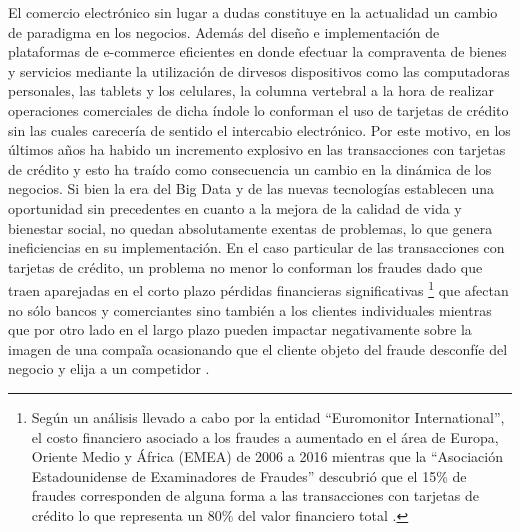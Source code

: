 \documentclass[11pt,a4paper]{article}
\begin{document}
El comercio electr\'onico sin lugar a dudas constituye en la actualidad un cambio de paradigma en los negocios. Adem\'as del dise\~no e implementaci\'on de plataformas de e-commerce eficientes en donde efectuar la compraventa de bienes y servicios mediante la utilizaci\'on de dirvesos dispositivos como las computadoras personales, las tablets y los celulares, la columna vertebral a la hora de realizar operaciones comerciales de dicha \'indole lo conforman el uso de tarjetas de cr\'edito sin las cuales carecer\'ia de sentido el intercabio electr\'onico. Por este motivo, en los \'ultimos a\~nos ha habido un incremento explosivo en las transacciones con tarjetas de cr\'edito y esto ha tra\'ido como consecuencia un cambio en la din\'amica de los negocios. Si bien la era del Big Data y de las nuevas tecnolog\'ias establecen una oportunidad sin precedentes en cuanto a la mejora de la calidad de vida y bienestar social, no quedan absolutamente exentas de problemas, lo que genera ineficiencias en su implementaci\'on. En el caso particular de las transacciones con tarjetas de cr\'edito, un problema no menor lo conforman los fraudes dado que traen aparejadas en el corto plazo p\'erdidas financieras significativas \footnote{Seg\'un un an\'alisis llevado a cabo por la entidad ``Euromonitor International'', el costo financiero asociado a los fraudes a aumentado en el \'area de Europa, Oriente Medio y \'Africa (EMEA) de 2006 a 2016 mientras que la ``Asociaci\'on Estadounidense de Examinadores de Fraudes'' descubri\'o que el 15\% de fraudes corresponden de alguna forma a las transacciones con tarjetas de cr\'edito lo que representa un 80\% del valor financiero total \cite{carta2019fraud}.} que afectan no s\'olo bancos y comerciantes sino tambi\'en a los clientes individuales mientras que por otro lado en el largo plazo pueden impactar negativamente sobre la imagen de una compa\~ia ocasionando que el cliente objeto del fraude desconf\'ie del negocio y elija a un competidor \cite{dal2014learned}.\\
\end{document}
